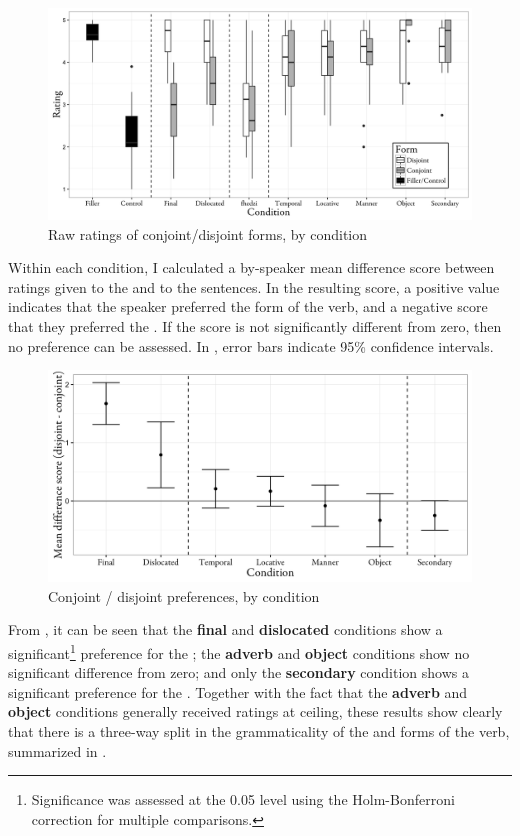 \documentclass[output=paper 
,modfonts
,nonflat]{langsci/langscibook}
\begin{document}
\begin{figure}[p]
	\caption{Raw ratings of conjoint\slash disjoint forms, by condition}
	\label{fig:kusmer:rawscores}
\includegraphics[width=\textwidth]{figures/proc-raw.png}
\end{figure}

Within each condition, I calculated a by-speaker mean difference score between
ratings given to the  and to the  sentences. In the resulting
score, a positive value indicates that the speaker preferred the  form
of the verb, and a negative score that they preferred the . If the score
is not significantly different from zero, then no preference can be assessed.
In , error bars indicate 95\% confidence intervals.


\begin{figure}[p]
	\caption{Conjoint / disjoint preferences, by condition}
	\label{fig:kusmer:meanscores}
\includegraphics[width=\textwidth]{figures/proc-results.png}
\end{figure}


From , it can be seen that the \textbf{final} and
\textbf{dislocated} conditions show a significant\footnote{Significance was
assessed at the 0.05 level using the Holm-Bonferroni correction for multiple
comparisons.} preference for the ; the \textbf{adverb} and
\textbf{object} conditions show no significant difference from zero; and only
the \textbf{secondary} condition shows a significant preference for the
. Together with the fact that the \textbf{adverb} and \textbf{object}
conditions generally received ratings at ceiling, these results show clearly
that there is a three-way split in the grammaticality of the  and
 forms of the verb, summarized in .
\end{document}
